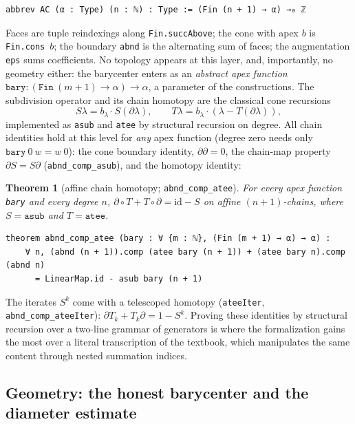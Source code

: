 \documentclass[11pt]{article}
\newtheorem{theorem}{Theorem}[section]
\theoremstyle{remark}
\newcommand{\leanname}[1]{\texttt{#1}}
\begin{document}
\begin{lstlisting}
abbrev AC (α : Type) (n : ℕ) : Type := (Fin (n + 1) → α) →₀ ℤ
\end{lstlisting}

Faces are tuple reindexings along \leanname{Fin.succAbove}; the cone with
apex $b$ is \leanname{Fin.cons}~$b$; the boundary \leanname{abnd} is the
alternating sum of faces; the augmentation \leanname{eps} sums coefficients.
No topology appears at this layer, and, importantly, no geometry either: the
barycenter enters as an \emph{abstract apex function}
$\leanname{bary} : (\leanname{Fin}\ (m+1) \to \alpha) \to \alpha$, a
parameter of the constructions. The subdivision operator and its chain
homotopy are the classical cone recursions
\[
S\lambda = b_\lambda \cdot S(\partial\lambda),
\qquad
T\lambda = b_\lambda \cdot (\lambda - T(\partial\lambda)),
\]
implemented as \leanname{asub} and \leanname{atee} by structural recursion
on degree. All chain identities hold at this level for \emph{any} apex
function (degree zero needs only $\leanname{bary}\ 0\ w = w\ 0$): the cone
boundary identity, $\partial\partial = 0$, the chain-map property
$\partial S = S\partial$ (\leanname{abnd\_comp\_asub}), and the homotopy
identity:

\begin{theorem}[affine chain homotopy; \leanname{abnd\_comp\_atee}]
\label{thm:atee}
For every apex function \leanname{bary} and every degree $n$,
$\partial \circ T + T \circ \partial = \mathrm{id} - S$ on affine
$(n+1)$-chains, where $S = \leanname{asub}$ and $T = \leanname{atee}$.
\end{theorem}

\begin{lstlisting}
theorem abnd_comp_atee (bary : ∀ {m : ℕ}, (Fin (m + 1) → α) → α) :
    ∀ n, (abnd (n + 1)).comp (atee bary (n + 1)) + (atee bary n).comp (abnd n)
      = LinearMap.id - asub bary (n + 1)
\end{lstlisting}

The iterates $S^k$ come with a telescoped homotopy
(\leanname{ateeIter}, \leanname{abnd\_comp\_ateeIter}):
$\partial T_k + T_k \partial = 1 - S^k$. Proving these identities by
structural recursion over a two-line grammar of generators is where the
formalization gains the most over a literal transcription of the textbook,
which manipulates the same content through nested summation indices.

\subsection{Geometry: the honest barycenter and the diameter estimate}
\end{document}
